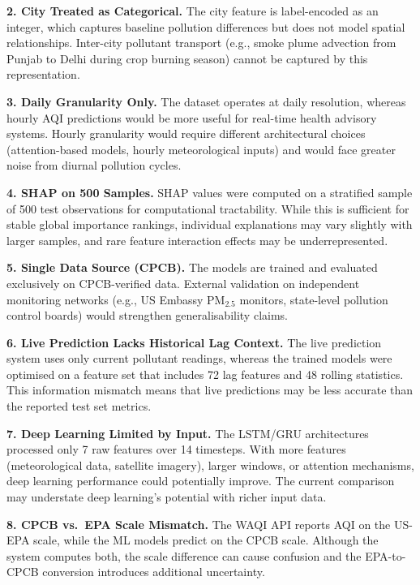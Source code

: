 \documentclass[12pt,a4paper]{report}
\begin{document}
\textbf{2. City Treated as Categorical.} The city feature is label-encoded as an integer, which captures baseline pollution differences but does not model spatial relationships. Inter-city pollutant transport (e.g., smoke plume advection from Punjab to Delhi during crop burning season) cannot be captured by this representation.

\textbf{3. Daily Granularity Only.} The dataset operates at daily resolution, whereas hourly AQI predictions would be more useful for real-time health advisory systems. Hourly granularity would require different architectural choices (attention-based models, hourly meteorological inputs) and would face greater noise from diurnal pollution cycles.

\textbf{4. SHAP on 500 Samples.} SHAP values were computed on a stratified sample of 500 test observations for computational tractability. While this is sufficient for stable global importance rankings, individual explanations may vary slightly with larger samples, and rare feature interaction effects may be underrepresented.

\textbf{5. Single Data Source (CPCB).} The models are trained and evaluated exclusively on CPCB-verified data. External validation on independent monitoring networks (e.g., US Embassy PM$_{2.5}$ monitors, state-level pollution control boards) would strengthen generalisability claims.

\textbf{6. Live Prediction Lacks Historical Lag Context.} The live prediction system uses only current pollutant readings, whereas the trained models were optimised on a feature set that includes 72 lag features and 48 rolling statistics. This information mismatch means that live predictions may be less accurate than the reported test set metrics.

\textbf{7. Deep Learning Limited by Input.} The LSTM/GRU architectures processed only 7 raw features over 14 timesteps. With more features (meteorological data, satellite imagery), larger windows, or attention mechanisms, deep learning performance could potentially improve. The current comparison may understate deep learning's potential with richer input data.

\textbf{8. CPCB vs.\ EPA Scale Mismatch.} The WAQI API reports AQI on the US-EPA scale, while the ML models predict on the CPCB scale. Although the system computes both, the scale difference can cause confusion and the EPA-to-CPCB conversion introduces additional uncertainty.

\clearpage
\end{document}
